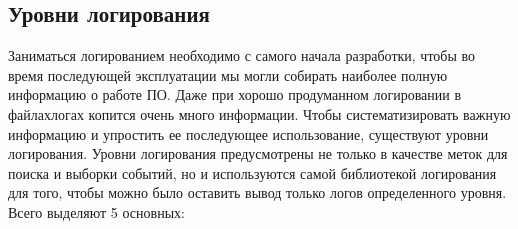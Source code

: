 \documentclass[letterpaper,10pt,russian]{sphinxmanual}
\begin{document}
\subsection{Уровни логирования}
\label{\detokenize{educational_materials/logging/content:id4}}
\sphinxAtStartPar
Заниматься логированием необходимо с самого начала разработки, чтобы во время последующей эксплуатации мы могли собирать наиболее полную информацию о работе ПО. Даже при хорошо продуманном логировании в файлах\sphinxhyphen{}логах копится очень много информации. Чтобы систематизировать важную информацию и упростить ее последующее использование, существуют уровни логирования. Уровни логирования предусмотрены не только в качестве меток для поиска и выборки событий, но и используются самой библиотекой логирования для того, чтобы можно было оставить вывод только логов определенного уровня. Всего выделяют 5 основных:
\end{document}
